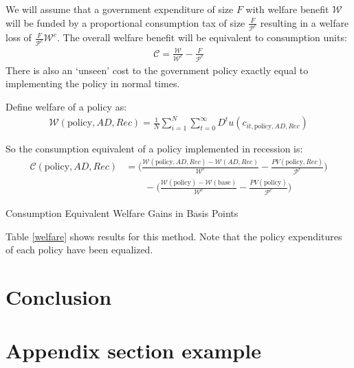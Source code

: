 \documentclass[11pt]{article}
\begin{document}
	We will assume that a government expenditure of size $F$ with welfare benefit $\mathcal{W}$ will be funded by a proportional consumption tax of size $\frac{F}{\mathcal{P}^c}$ resulting in a welfare loss of $\frac{F}{\mathcal{P}^c}\mathcal{W}^c$. The overall welfare benefit will be equivalent to consumption units:
	\begin{align}
	\mathcal{C} = \frac{\mathcal{W}}{\mathcal{W}^c} - \frac{F}{\mathcal{P}^c}
	\end{align}
	There is also an `unseen' cost to the government policy exactly equal to implementing the policy in normal times.
	
	Define welfare of a policy as:
	\begin{align}
	\mathcal{W}(\text{policy},AD,Rec) = \frac{1}{N}\sum_{i=1}^{N} \sum_{t=0}^{\infty} D^t u(c_{it,\text{policy},AD,Rec})
	\end{align}
	
	So the consumption equivalent of a policy implemented in recession is:
	\begin{align}
	\mathcal{C}(\text{policy},AD,Rec) &= \bigg(\frac{\mathcal{W}(\text{policy},AD,Rec)-\mathcal{W}(AD,Rec)}{\mathcal{W}^c} - \frac{PV(\text{policy},Rec)}{\mathcal{P}^c} \bigg)\\ \nonumber
	& \qquad -
	\bigg(\frac{\mathcal{W}(\text{policy}) - \mathcal{W}(\text{base})}{\mathcal{W}^c} - \frac{PV(\text{policy})}{\mathcal{P}^c} \bigg)
	\end{align}
	
	\begin{table} 
		\center
		
		\caption{Consumption Equivalent Welfare Gains in Basis Points }
		\label{welfare}
	\end{table}
	
	Table \ref{welfare} shows results for this method. Note that the policy expenditures of each policy have been equalized.
	
	\section{Conclusion}
	
	\appendix
	\section{Appendix section example}
	
	
	
\end{document}
